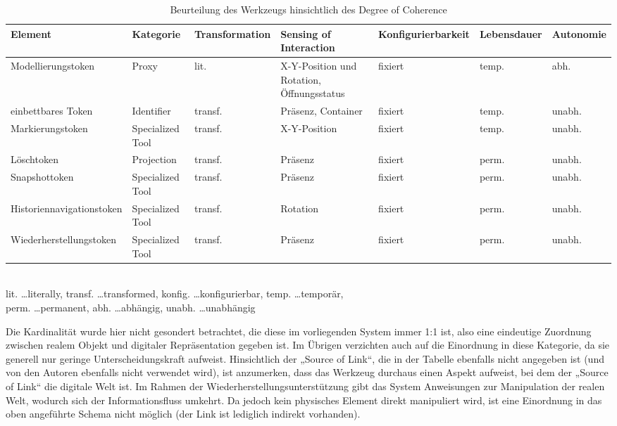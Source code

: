 \begin{table}[htbp]
	\centering
	\caption{Beurteilung des Werkzeugs hinsichtlich des Degree of Coherence}
	\begin{tabular}{| p{2cm} || p{2cm} | p{} | p{} | p{} | p{} | p{} |} \hline
		Element & Kategorie & Trans\-for\-mation & Sensing of Inter\-action & Konfig\-urierbar\-keit & Lebens\-dauer & Auto\-nomie \\ \hline \hline
		Modell\-ierungs\-token  & Proxy & lit. & X-Y-Position und Rotation, Öffnungsstatus & fixiert & temp. & abh. \\ \hline
		einbett\-bares Token & Identifier & transf. & Präsenz, Container & fixiert & temp. & unabh. \\ \hline
		Mark\-ierungs\-token & Specialized Tool & transf. & X-Y-Position & fixiert & temp. & unabh. \\ \hline
		Löschtoken & Projection & transf. & Präsenz & fixiert & perm. & unabh. \\ \hline
		Snapshot\-token & Specialized Tool & transf. & Präsenz & fixiert & perm. & unabh. \\ \hline
		Historien\-navigations\-token & Specialized Tool & transf. & Rotation & fixiert & perm. & unabh. \\ \hline
		Wieder\-herstellungs\-token & Specialized Tool & transf. & Präsenz & fixiert & perm. & unabh. \\ \hline
	\end{tabular} \\
	\footnotesize lit. \ldots literally, transf. \ldots transformed, konfig. \ldots konfigurierbar, temp. \ldots temporär,\\ perm. \ldots permanent, abh. \ldots abhängig, unabh. \ldots unabhängig
	\label{tab:degree_of_coherence}
\end{table}

Die Kardinalität wurde hier nicht gesondert betrachtet, die diese im vorliegenden System immer 1:1 ist, also eine eindeutige Zuordnung zwischen realem Objekt und digitaler Repräsentation gegeben ist. Im Übrigen verzichten auch \citet{Koleva03} auf die Einordnung in diese Kategorie, da sie generell nur geringe Unterscheidungskraft aufweist. Hinsichtlich der „Source of Link“, die in der Tabelle ebenfalls nicht angegeben ist (und von den Autoren ebenfalls nicht verwendet wird), ist anzumerken, dass das Werkzeug durchaus einen Aspekt aufweist, bei dem der „Source of Link“ die digitale Welt ist. Im Rahmen der Wiederherstellungsunterstützung gibt das System Anweisungen zur Manipulation der realen Welt, wodurch sich der Informationsfluss umkehrt. Da jedoch kein physisches Element direkt manipuliert wird, ist eine Einordnung in das oben angeführte Schema nicht möglich (der Link ist lediglich indirekt vorhanden).

